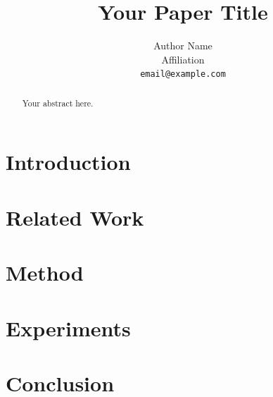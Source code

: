 \documentclass{article}
\title{Your Paper Title}
\author{
  Author Name \\
  Affiliation \\
  \texttt{email@example.com}
}
\begin{document}
\maketitle

\begin{abstract}
Your abstract here.
\end{abstract}

\section{Introduction}

\section{Related Work}

\section{Method}

\section{Experiments}

\section{Conclusion}



\end{document}
